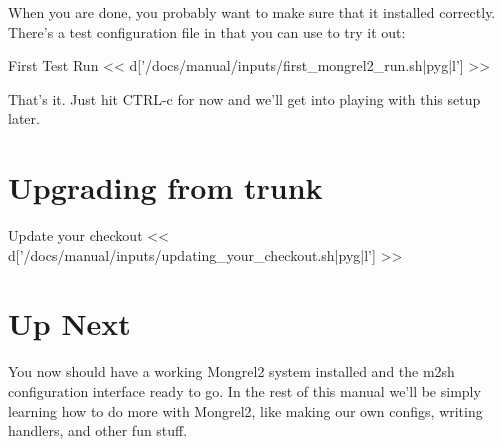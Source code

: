 When you are done, you probably want to make sure that it installed correctly.
There's a test configuration file in  that you can
use to try it out:

\begin{code}{First Test Run}
<< d['/docs/manual/inputs/first_mongrel2_run.sh|pyg|l'] >>
\end{code}

That's it.  Just hit CTRL-c for now and we'll get into playing with this
setup later.

\section{Upgrading from trunk}
\begin{code}{Update your checkout}
<< d['/docs/manual/inputs/updating_your_checkout.sh|pyg|l'] >>
\end{code}



\section{Up Next}

You now should have a working Mongrel2 system installed and the m2sh configuration
interface ready to go.  In the rest of this manual we'll be simply learning how
to do more with Mongrel2, like making our own configs, writing handlers, and other
fun stuff.

